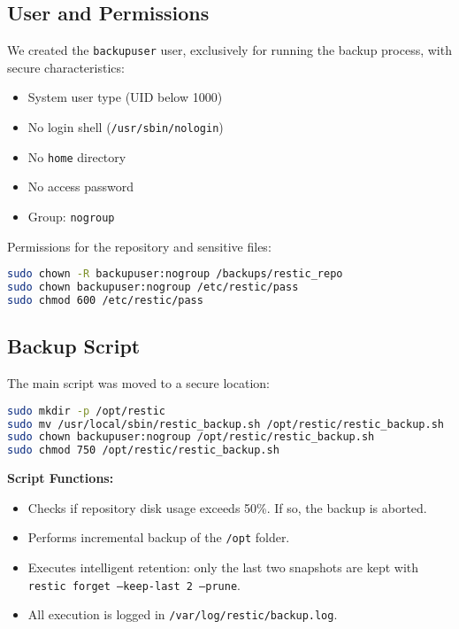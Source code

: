 \documentclass[12pt]{report}
\begin{document}
\subsection*{User and Permissions}

We created the \texttt{backupuser} user, exclusively for running the backup process, with secure characteristics:

\begin{itemize}
    \item System user type (UID below 1000)
    \item No login shell (\texttt{/usr/sbin/nologin})
    \item No \texttt{home} directory
    \item No access password
    \item Group: \texttt{nogroup}
\end{itemize}

Permissions for the repository and sensitive files:

\begin{lstlisting}[language=bash, caption={Repository and Password Permissions}]
sudo chown -R backupuser:nogroup /backups/restic_repo
sudo chown backupuser:nogroup /etc/restic/pass
sudo chmod 600 /etc/restic/pass
\end{lstlisting}

\subsection*{Backup Script}

The main script was moved to a secure location:

\begin{lstlisting}[language=bash, caption={Backup Script Organization}]
sudo mkdir -p /opt/restic
sudo mv /usr/local/sbin/restic_backup.sh /opt/restic/restic_backup.sh
sudo chown backupuser:nogroup /opt/restic/restic_backup.sh
sudo chmod 750 /opt/restic/restic_backup.sh
\end{lstlisting}

\textbf{Script Functions:}

\begin{itemize}
    \item Checks if repository disk usage exceeds 50\%. If so, the backup is aborted.
    \item Performs incremental backup of the \texttt{/opt} folder.
    \item Executes intelligent retention: only the last two snapshots are kept with \texttt{restic forget --keep-last 2 --prune}.
    \item All execution is logged in \texttt{/var/log/restic/backup.log}.
\end{itemize}
\end{document}
